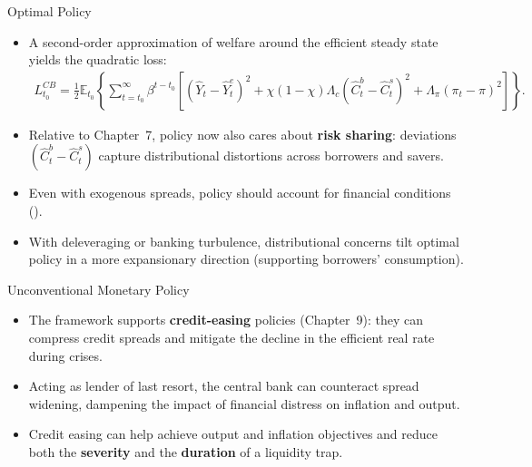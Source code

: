 \documentclass[11pt,aspectratio=169]{beamer}
\newcommand{\E}{\mathbb{E}}
\begin{document}
\begin{frame}{Optimal Policy}
\small
\begin{itemize}
  \item A second-order approximation of welfare around the efficient steady state yields the quadratic loss:
  \begin{align}
    L_{t_0}^{CB}
    =\frac{1}{2}\E_{t_0}\!\left\{\sum_{t=t_0}^\infty \beta^{t-t_0}\left[
      (\hat{Y}_t-\hat{Y}_t^{e})^2
      +\chi(1-\chi)\Lambda_c(\hat{C}_t^b-\hat{C}_t^s)^2
      +\Lambda_\pi(\pi_t-\pi)^2
    \right]\right\}.
    \label{eq28}
  \end{align}
  \vspace{0.15em}
  \item Relative to Chapter~7, policy now also cares about \textbf{risk sharing}:
  deviations $(\hat C_t^b-\hat C_t^s)$ capture distributional distortions across borrowers and savers.
  \vspace{0.25em}
  \item Even with exogenous spreads, policy should account for financial conditions
  (\cite{CurdiaWoodford2016}).
  \item With deleveraging or banking turbulence, distributional concerns tilt optimal policy in a more expansionary direction (supporting borrowers' consumption).
\end{itemize}
\end{frame}

\begin{frame}{Unconventional Monetary Policy}
\small
\begin{itemize}
  \item The framework supports \textbf{credit-easing} policies (Chapter~9):
  they can compress credit spreads and mitigate the decline in the efficient real rate during crises.
  \vspace{0.25em}
  \item Acting as lender of last resort, the central bank can counteract spread widening,
  dampening the impact of financial distress on inflation and output.
  \vspace{0.25em}
  \item Credit easing can help achieve output and inflation objectives and reduce both the \textbf{severity} and the \textbf{duration} of a liquidity trap.
\end{itemize}
\end{frame}
\end{document}

